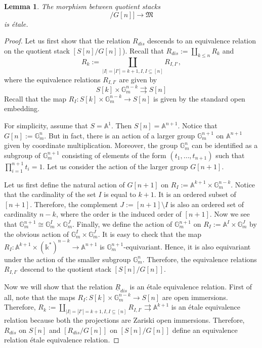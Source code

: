 \documentclass[11pt]{amsart}
\theoremstyle{plain}
\numberwithin{equation}{section}
\theoremstyle{definition}
\theoremstyle{plain}
\newtheorem{Lem}[Def]{Lemma}
\begin{document}
\begin{Lem}\label{et1}
The morphism between quotient stacks 
\begin{equation}
[S[n]/G[n]]\longrightarrow \mathfrak M
\end{equation}
is \'{e}tale.
\end{Lem}
\begin{proof}
Let us first show that the relation $R_{dis}$ descends to an equivalence relation on the quotient stack $[S[n]/G[n]]$).
Recall that $R_{dis}:=\underset{k\leq n}\coprod R_{k}$ and \[R_{k}:=\underset{|I|=|I'|=k+1, I, I\subseteq [n]}\coprod R_{I, I'},\] where 
the equivalence relations $R_{I,I'}$ are given by 
\begin{equation}
S[k]\times \mathbb{G}_m^{n-k}\rightrightarrows S[n]
\end{equation}
Recall that the map $R_I: S[k]\times \mathbb{G}_m^{n-k}\longrightarrow S[n]$ is given by the standard open embedding. 

For simplicity, assume that $S=\mathbb A^1$. Then $S[n]=\mathbb A^{n+1}$. Notice that $G[n]:=\mathbb G_m^{n}$. But in fact, there is an action of a larger group $\mathbb G_m^{n+1}$ on $\mathbb A^{n+1}$ given by coordinate multiplication. Moreover, the group $\mathbb G_m^n$ can be identified as a subgroup of $\mathbb G_m^{n+1}$ consisting of elements of the form $(t_1, \dots, t_{n+1})$ such that $\prod^{n+1}_{i=1} t_i=1$. Let us consider the action of the larger group $G[n+1]$. 

Let us first define the natural action of $G[n+1]$ on $R_I:=\mathbb A^{k+1}\times \mathbb{G}_m^{n-k}$. Notice that the cardinality of the set $I$ is equal to $k+1$. It is an ordered subset of $[n+1]$. Therefore, the complement $J:=[n+1]\setminus I$ is also an ordered set of cardinality $n-k$, where the order is the induced order of $[n+1]$. Now we see that $\mathbb G_m^{n+1}\cong \mathbb G_m^{I}\times \mathbb G_m^J$. Finally, we define the action of $\mathbb G_m^{n+1}$ on $R_I:=\mathbb A^I\times \mathbb{G}_m^J$ by the obvious action of $\mathbb G_m^{I}\times \mathbb G_m^J$. It is easy to check that the map $R_I: \mathbb A^{k+1}\times (\mathbb k^*)^{n-k}\longrightarrow \mathbb A^{n+1}$ is $\mathbb G_m^{n+1}$-equivariant. Hence, it is also equivariant under the action of the smaller subgroup $\mathbb G_m^{n}$. Therefore, the equivalence relations $R_{I, I'}$ descend to the quotient stack $[S[n]/G[n]]$.

Now we will show that the relation $\underline{R}_{dis}$ is an \'{e}tale equivalence relation. First of all, note that the maps $R_I: S[k]\times \mathbb{G}_m^{n-k}\longrightarrow S[n]$ are open immersions. Therefore, $R_{k}:=\coprod_{|I|=|I'|=k+1, I, I\subseteq [n]} R_{I, I'}\rightrightarrows \mathbb A^{k+1}$ is an \'{e}tale equivalence relation because both the projections are Zariski open immersions. Therefore,  $R_{dis}$ on $S[n]$ and $[R_{dis}/G[n]]$ on $[S[n]/G[n]]$ define an equivalence relation \'{e}tale equivalence relation.
\end{proof}
\end{document}
